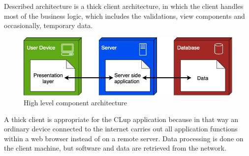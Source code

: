 Described architecture is a thick client architecture, in which the client handles most of the business logic, which includes the validations, view components and occasionally, temporary data.
\begin{figure}[H]
    \centering
    \includegraphics[height=0.2\textwidth]{Images/Overview.png}
    \caption{High level component architecture}
\end{figure}

A thick client is appropriate for the CLup application because in that way an ordinary device connected to the internet carries out all application functions within a web browser instead of on a remote server.
Data processing is done on the client machine, but software and data are retrieved from the network.


